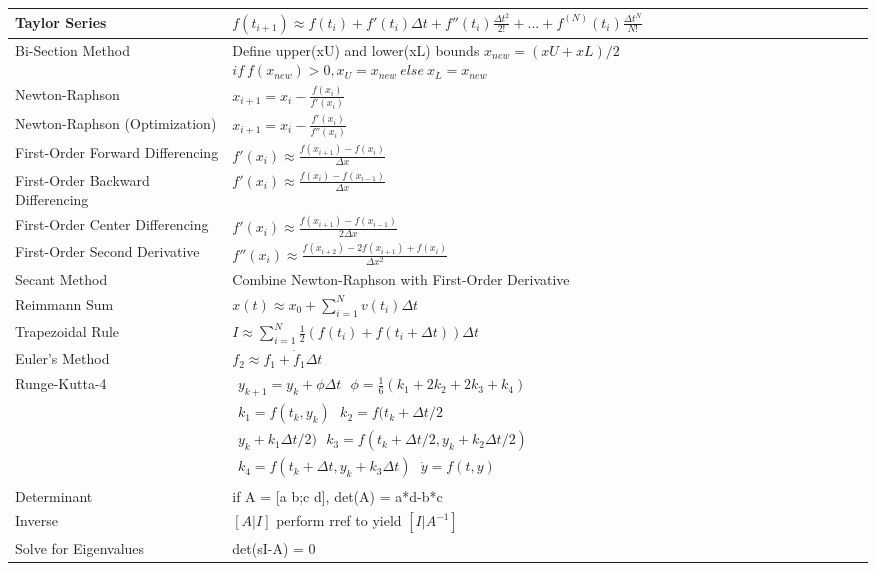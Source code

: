 \documentclass[11pt,a4paper,twoside,openright]{book}
\begin{document}
\begin{tabular}{|l | l|}
\hline
Taylor Series & $f(t_{i+1}) \approx f(t_i) + f'(t_i)\Delta t +
f''(t_i)\frac{\Delta t^2}{2!} +
... + f^{(N)}(t_i)\frac{\Delta
  t^N}{N!}$\\
\hline
Bi-Section Method & \pbox{12cm}{Define upper(xU) and lower(xL) bounds
  \\ $x_{new} =
  (xU+xL)/2$\\$if~f(x_{new})>0,x_U=x_{new}~else~x_L=x_{new}$}\\
\hline
Newton-Raphson & $x_{i+1} = x_i - \frac{f(x_i)}{f'(x_i)}$\\
\hline
Newton-Raphson (Optimization) & $x_{i+1} = x_i - \frac{f'(x_i)}{f''(x_i)}$\\
\hline
First-Order Forward Differencing & $f'(x_{i}) \approx
\frac{f(x_{i+1})-f(x_i)}{\Delta x}$\\
\hline
First-Order Backward Differencing & $f'(x_{i}) \approx \frac{f(x_{i})-f(x_{i-1})}{\Delta x}$\\
\hline
First-Order Center Differencing & $f'(x_{i}) \approx \frac{f(x_{i+1})-f(x_{i-1})}{2\Delta x}$\\
\hline
First-Order Second Derivative & $f''(x_{i}) \approx \frac{f(x_{i+2}) -2 f(x_{i+1}) + f(x_i)}{\Delta x^2}$\\
\hline
Secant Method & Combine Newton-Raphson with First-Order Derivative \\
\hline
Reimmann Sum &  $x(t) \approx x_0 + \sum\limits_{i=1}^Nv(t_i) \Delta
t$\\
\hline
Trapezoidal Rule & $I \approx \sum\limits_{i=1}^{N}\frac{1}2 (f(t_i)+f(t_i+\Delta t))\Delta t$\\
\hline
Euler's Method &  $f_2 \approx f_1 + \dot{f}_1\Delta t $\\
\hline
Runge-Kutta-4 & $\begin{matrix}
y_{k+1} = y_k + \phi \Delta t~~~\phi = \frac{1} 6(k_1 + 2 k_2 + 2 k_3 + k_4) \\
k_1 = f(t_k,y_k)~~~k_2 = f(t_k + \Delta t/2\\
y_k + k_1 \Delta t/2)~~~k_3 = f(t_k + \Delta t/2,y_k + k_2 \Delta t/2) \\
k_4 = f(t_k + \Delta t,y_k + k_3 \Delta t)~~~\dot{y} = f(t,y)
\end{matrix}$\\
\hline
Determinant & if A = [a b;c d], det(A) = a*d-b*c \\
\hline
Inverse & $[A|I]$ perform rref to yield $[I|A^{-1}]$\\
\hline
Solve for Eigenvalues & det(sI-A) = 0\\

\end{tabular}
\end{document}

